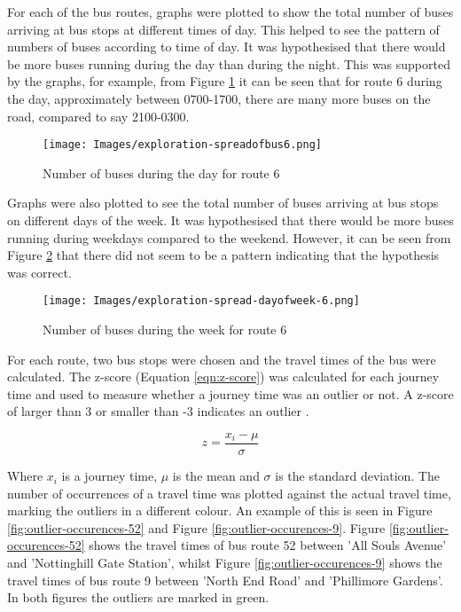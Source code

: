 For each of the bus routes, graphs were plotted to show the total number of buses arriving at bus stops at different times of day. This helped to see the pattern of numbers of buses according to time of day. It was hypothesised that there would be more buses running during the day than during the night. This was supported by the graphs, for example, from Figure \ref{fig:spread-of-buses-over-day-6} it can be seen that for route 6 during the day, approximately between 0700-1700, there are many more buses on the road, compared to say 2100-0300. 

\begin{figure}[H]
\begin{center}
    \texttt{[image: Images/exploration-spreadofbus6.png]}
    \caption{Number of buses during the day for route 6}
    \label{fig:spread-of-buses-over-day-6}
\end{center}
\end{figure}

Graphs were also plotted to see the total number of buses arriving at bus stops on different days of the week. It was hypothesised that there would be more buses running during weekdays compared to the weekend. However, it can be seen from Figure \ref{fig:spread-of-buses-over-week-6} that there did not seem to be a pattern indicating that the hypothesis was correct.

\begin{figure}[H]
\begin{center}
    \texttt{[image: Images/exploration-spread-dayofweek-6.png]}
    \caption{Number of buses during the week for route 6}
    \label{fig:spread-of-buses-over-week-6}
\end{center}
\end{figure}

For each route, two bus stops were chosen and the travel times of the bus were calculated. The z-score (Equation \ref{eqn:z-score}) was calculated for each journey time and used to measure whether a journey time was an outlier or not. A z-score of larger than 3 or smaller than -3 indicates an outlier \cite{significance-of-eda}. 

\begin{equation}
    z = \frac{x_i - \mu}{\sigma}
    \label{eqn:z-score}
\end{equation}

\noindent Where $x_i$ is a journey time, $\mu$ is the mean and $\sigma$ is the standard deviation. The number of occurrences of a travel time was plotted against the actual travel time, marking the outliers in a different colour. An example of this is seen in Figure \ref{fig:outlier-occurences-52} and Figure \ref{fig:outlier-occurences-9}. Figure \ref{fig:outlier-occurences-52} shows the travel times of bus route 52 between 'All Souls Avenue' and 'Nottinghill Gate Station', whilst Figure \ref{fig:outlier-occurences-9} shows the travel times of bus route 9 between 'North End Road' and 'Phillimore Gardens'. In both figures the outliers are marked in green.

